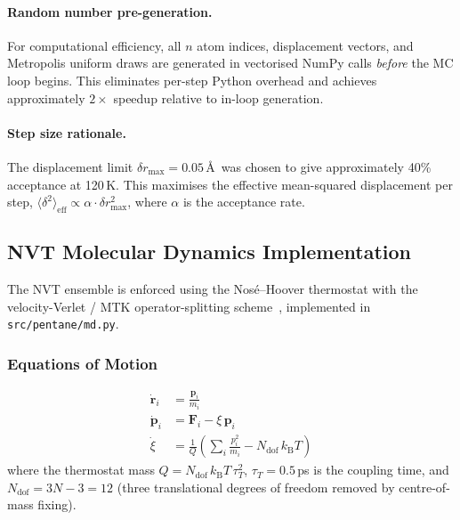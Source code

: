 \documentclass[12pt,a4paper]{article}
\begin{document}
\paragraph{Random number pre-generation.}
For computational efficiency, all $n$ atom indices, displacement vectors,
and Metropolis uniform draws are generated in vectorised NumPy calls
\emph{before} the MC loop begins.  This eliminates per-step Python overhead
and achieves approximately $2\times$ speedup relative to in-loop generation.

\paragraph{Step size rationale.}
The displacement limit $\delta r_{\max} = 0.05$\,\AA\ was chosen to give
approximately 40\% acceptance at 120\,K.  This maximises the effective
mean-squared displacement per step,
$\langle \delta^2 \rangle_{\mathrm{eff}} \propto \alpha \cdot \delta r_{\max}^2$,
where $\alpha$ is the acceptance rate.

\subsection{NVT Molecular Dynamics Implementation}
The NVT ensemble is enforced using the Nos\'{e}--Hoover thermostat with the
velocity-Verlet / MTK operator-splitting scheme~\citep{Martyna1996},
implemented in \texttt{src/pentane/md.py}.

\subsubsection{Equations of Motion}
\begin{align}
  \dot{\mathbf{r}}_i &= \frac{\mathbf{p}_i}{m_i} \\
  \dot{\mathbf{p}}_i &= \mathbf{F}_i - \xi\,\mathbf{p}_i \label{eq:nh_p}\\
  \dot{\xi}           &= \frac{1}{Q}\left(\sum_i \frac{p_i^2}{m_i}
                         - N_{\mathrm{dof}}\,k_{\mathrm{B}}T\right) \label{eq:nh_xi}
\end{align}
where the thermostat mass $Q = N_{\mathrm{dof}}\,k_{\mathrm{B}}T\,\tau_T^2$,
$\tau_T = 0.5$\,ps is the coupling time, and $N_{\mathrm{dof}} = 3N - 3 = 12$
(three translational degrees of freedom removed by centre-of-mass fixing).
\end{document}
